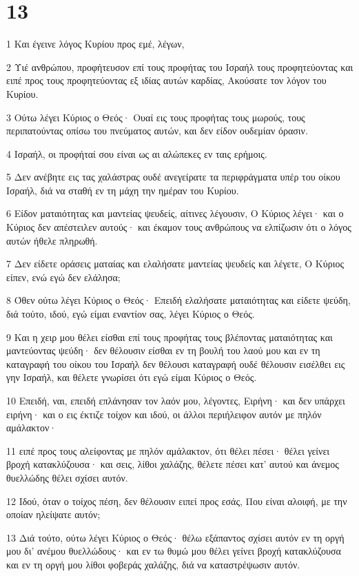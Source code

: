 \chapter{13}

\par 1 Και έγεινε λόγος Κυρίου προς εμέ, λέγων,
\par 2 Υιέ ανθρώπου, προφήτευσον επί τους προφήτας του Ισραήλ τους προφητεύοντας και ειπέ προς τους προφητεύοντας εξ ιδίας αυτών καρδίας, Ακούσατε τον λόγον του Κυρίου.
\par 3 Ούτω λέγει Κύριος ο Θεός· Ουαί εις τους προφήτας τους μωρούς, τους περιπατούντας οπίσω του πνεύματος αυτών, και δεν είδον ουδεμίαν όρασιν.
\par 4 Ισραήλ, οι προφήταί σου είναι ως αι αλώπεκες εν ταις ερήμοις.
\par 5 Δεν ανέβητε εις τας χαλάστρας ουδέ ανεγείρατε τα περιφράγματα υπέρ του οίκου Ισραήλ, διά να σταθή εν τη μάχη την ημέραν του Κυρίου.
\par 6 Είδον ματαιότητας και μαντείας ψευδείς, αίτινες λέγουσιν, Ο Κύριος λέγει· και ο Κύριος δεν απέστειλεν αυτούς· και έκαμον τους ανθρώπους να ελπίζωσιν ότι ο λόγος αυτών ήθελε πληρωθή.
\par 7 Δεν είδετε οράσεις ματαίας και ελαλήσατε μαντείας ψευδείς και λέγετε, Ο Κύριος είπεν, ενώ εγώ δεν ελάλησα;
\par 8 Όθεν ούτω λέγει Κύριος ο Θεός· Επειδή ελαλήσατε ματαιότητας και είδετε ψεύδη, διά τούτο, ιδού, εγώ είμαι εναντίον σας, λέγει Κύριος ο Θεός.
\par 9 Και η χειρ μου θέλει είσθαι επί τους προφήτας τους βλέποντας ματαιότητας και μαντεύοντας ψεύδη· δεν θέλουσιν είσθαι εν τη βουλή του λαού μου και εν τη καταγραφή του οίκου του Ισραήλ δεν θέλουσι καταγραφή ουδέ θέλουσιν εισέλθει εις γην Ισραήλ, και θέλετε γνωρίσει ότι εγώ είμαι Κύριος ο Θεός.
\par 10 Επειδή, ναι, επειδή επλάνησαν τον λαόν μου, λέγοντες, Ειρήνη· και δεν υπάρχει ειρήνη· και ο εις έκτιζε τοίχον και ιδού, οι άλλοι περιήλειφον αυτόν με πηλόν αμάλακτον·
\par 11 ειπέ προς τους αλείφοντας με πηλόν αμάλακτον, ότι θέλει πέσει· θέλει γείνει βροχή κατακλύζουσα· και σεις, λίθοι χαλάζης, θέλετε πέσει κατ' αυτού και άνεμος θυελλώδης θέλει σχίσει αυτόν.
\par 12 Ιδού, όταν ο τοίχος πέση, δεν θέλουσιν ειπεί προς εσάς, Που είναι αλοιφή, με την οποίαν ηλείψατε αυτόν;
\par 13 Διά τούτο, ούτω λέγει Κύριος ο Θεός· θέλω εξάπαντος σχίσει αυτόν εν τη οργή μου δι' ανέμου θυελλώδους· και εν τω θυμώ μου θέλει γείνει βροχή κατακλύζουσα και εν τη οργή μου λίθοι φοβεράς χαλάζης, διά να καταστρέψωσιν αυτόν.
